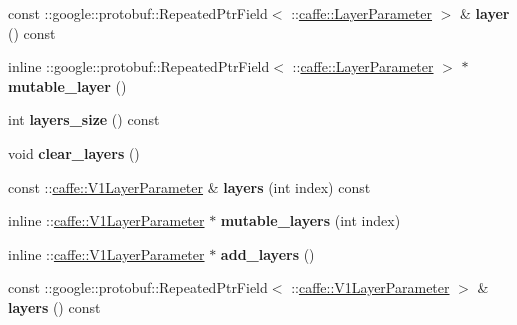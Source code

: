 \begin{DoxyCompactItemize}
\item 
\mbox{\label{classcaffe_1_1_net_parameter_ac3aaa8438005e42c68cd10bac5c319c7}} 
const \+::google\+::protobuf\+::\+Repeated\+Ptr\+Field$<$ \+::\mbox{\hyperlink{classcaffe_1_1_layer_parameter}{caffe\+::\+Layer\+Parameter}} $>$ \& {\bfseries layer} () const
\item 
\mbox{\label{classcaffe_1_1_net_parameter_a248b88268f6dfd96c74b67fc5c93349f}} 
inline \+::google\+::protobuf\+::\+Repeated\+Ptr\+Field$<$ \+::\mbox{\hyperlink{classcaffe_1_1_layer_parameter}{caffe\+::\+Layer\+Parameter}} $>$ $\ast$ {\bfseries mutable\+\_\+layer} ()
\item 
\mbox{\label{classcaffe_1_1_net_parameter_a56f0dbb2e93369007190241c91e4b19c}} 
int {\bfseries layers\+\_\+size} () const
\item 
\mbox{\label{classcaffe_1_1_net_parameter_afda42a5c23fa298968abd46f86ac7aeb}} 
void {\bfseries clear\+\_\+layers} ()
\item 
\mbox{\label{classcaffe_1_1_net_parameter_a714417df88147a6c0e64c237c59ac5e0}} 
const \+::\mbox{\hyperlink{classcaffe_1_1_v1_layer_parameter}{caffe\+::\+V1\+Layer\+Parameter}} \& {\bfseries layers} (int index) const
\item 
\mbox{\label{classcaffe_1_1_net_parameter_a3a56064d7b2106c12c44463ff55ce1e5}} 
inline \+::\mbox{\hyperlink{classcaffe_1_1_v1_layer_parameter}{caffe\+::\+V1\+Layer\+Parameter}} $\ast$ {\bfseries mutable\+\_\+layers} (int index)
\item 
\mbox{\label{classcaffe_1_1_net_parameter_ac0cc50d5bc2a5823ea4491601aa1615b}} 
inline \+::\mbox{\hyperlink{classcaffe_1_1_v1_layer_parameter}{caffe\+::\+V1\+Layer\+Parameter}} $\ast$ {\bfseries add\+\_\+layers} ()
\item 
\mbox{\label{classcaffe_1_1_net_parameter_a7a0848e97446c25f8b9ef11efde40a37}} 
const \+::google\+::protobuf\+::\+Repeated\+Ptr\+Field$<$ \+::\mbox{\hyperlink{classcaffe_1_1_v1_layer_parameter}{caffe\+::\+V1\+Layer\+Parameter}} $>$ \& {\bfseries layers} () const

\end{DoxyCompactItemize}
